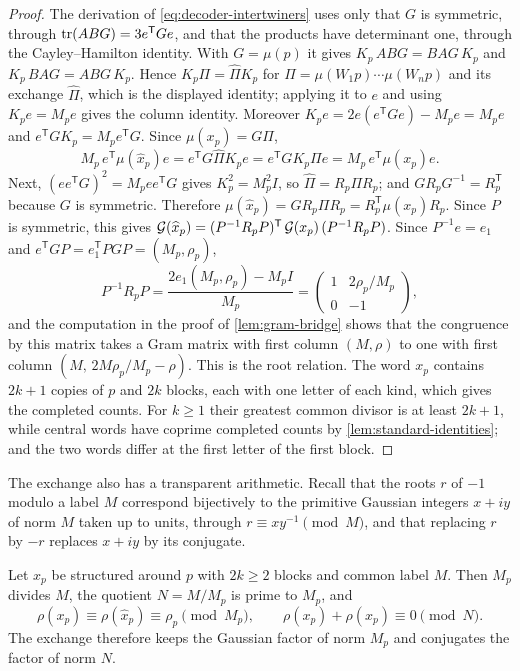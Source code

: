 \begin{proof}
The derivation of \eqref{eq:decoder-intertwiners} uses only that $G$ is symmetric, through
$\operatorname{tr}(ABG)=3e^{\mathsf T}Ge$, and that the products have determinant one, through the
Cayley--Hamilton identity. With $G=\mu(p)$ it gives $K_p\,ABG=BAG\,K_p$ and
$K_p\,BAG=ABG\,K_p$. Hence $K_p\Pi=\widehat\Pi K_p$ for $\Pi=\mu(W_1p)\cdots\mu(W_np)$ and its
exchange $\widehat\Pi$, which is the displayed identity; applying it to $e$ and using
$K_pe=M_pe$ gives the column identity. Moreover $K_pe=2e(e^{\mathsf T}Ge)-M_pe=M_pe$ and
$e^{\mathsf T}GK_p=M_pe^{\mathsf T}G$. Since $\mu(x_p)=G\Pi$,
$$
 M_p\,e^{\mathsf T}\mu(\widehat x_p)e=e^{\mathsf T}G\widehat\Pi K_pe=e^{\mathsf T}GK_p\Pi e
 =M_p\,e^{\mathsf T}\mu(x_p)e .
$$
Next, $(ee^{\mathsf T}G)^2=M_pee^{\mathsf T}G$ gives $K_p^2=M_p^2I$, so
$\widehat\Pi=R_p\Pi R_p$; and $GR_pG^{-1}=R_p^{\mathsf T}$ because $G$ is symmetric. Therefore
$\mu(\widehat x_p)=GR_p\Pi R_p=R_p^{\mathsf T}\mu(x_p)R_p$. Since $P$ is symmetric, this gives
$\mathcal{G}(\widehat x_p)=(P^{-1}R_pP)^{\mathsf T}\,\mathcal{G}(x_p)\,(P^{-1}R_pP)$. Since $P^{-1}e=e_1$ and
$e^{\mathsf T}GP=e_1^{\mathsf T}PGP=(M_p,\rho_p)$,
$$
 P^{-1}R_pP=\frac{2e_1(M_p,\rho_p)-M_pI}{M_p}=\begin{pmatrix}1&2\rho_p/M_p\\0&-1\end{pmatrix},
$$
and the computation in the proof of \cref{lem:gram-bridge} shows that the congruence by this
matrix takes a Gram matrix with first column $(M,\rho)$ to one with first column
$(M,\,2M\rho_p/M_p-\rho)$. This is the root relation. The word $x_p$ contains $2k+1$ copies of
$p$ and $2k$ blocks, each with one letter of each kind, which gives the completed counts.
For $k\geqslant1$ their greatest common divisor is at least $2k+1$, while central words have
coprime completed counts by \cref{lem:standard-identities}; and the two words differ at the
first letter of the first block.
\end{proof}

The exchange also has a transparent arithmetic. Recall that the roots $r$ of $-1$ modulo a
label $M$ correspond bijectively to the primitive Gaussian integers $x+iy$ of norm $M$ taken
up to units, through $r\equiv xy^{-1}\pmod M$, and that replacing $r$ by $-r$ replaces $x+iy$
by its conjugate.

\begin{proposition}
\label{prop:exchange-arithmetic}
Let $x_p$ be structured around $p$ with $2k\geqslant2$ blocks and common label $M$. Then
$M_p$ divides $M$, the quotient $N=M/M_p$ is prime to $M_p$, and
$$
 \rho(x_p)\equiv\rho(\widehat x_p)\equiv\rho_p\pmod{M_p},
 \qquad
 \rho(x_p)+\rho(\widehat x_p)\equiv0\pmod N .
$$
The exchange therefore keeps the Gaussian factor of norm $M_p$ and conjugates the factor of
norm $N$.
\end{proposition}

